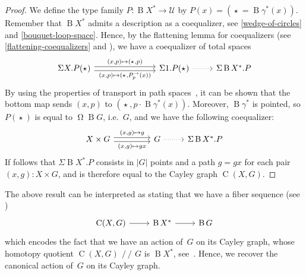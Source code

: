 \documentclass[10pt,a4paper]{amsart}
\theoremstyle{definition}
\newcommand{\freegroup}[1]{#1^*} %
\newcommand{\sizeof}[1]{|#1|} %
\newcommand{\B}{\operatorname{B}} %
\newcommand{\pt}[1]{\star_{#1}} %
\newcommand{\Cayley}[2]{\operatorname{C}(#1,#2)}
\newcommand{\pcomp}{\cdot} %
\newcommand{\subst}[2]{#1^\to_{#2}} %
\newcommand{\Loop}{\operatorname{\Omega}} %
\newcommand{\hq}{\mathop{\!/\!\!/\!}} %
\newcommand{\U}{\mathcal{U}} %
\newcommand{\ie}{i.e.~}
\begin{document}
\begin{proof}
  We define the type family $P:\B\freegroup X\to\U$ by
  $P(x)=(\pt{}=\B\freegroup \gamma(x))$. Remember that $\B\freegroup X$ admits a
  description as a coequalizer, see \cref{wedge-of-circles} and
  \cref{bouquet-loop-space}. Hence, by the flattening lemma for coequalizers
  (see \cref{flattening-coequalizers} and \cite[Section~6.12]{hottbook}), we
  have a coequalizer of total spaces
  \[
    \begin{tikzcd}
      \Sigma X.P(\pt{})
      \ar[r,shift left,"{(x,p)\mapsto(\pt{},p)}"]
      \ar[r,shift right,"{(x,p)\mapsto(\pt{},\subst Pp(x))}"']
      &[50]
      \Sigma 1.P(\pt{})
      \ar[r,dotted]
      &
      \Sigma \B\freegroup X.P
    \end{tikzcd}
  \]
  By using the properties of transport in path
  spaces~\cite[Theorem~2.11.3]{hottbook}, it can be shown that the bottom map
  sends $(x,p)$ to $(\pt{},p\pcomp\B\freegroup\gamma(x))$. Moreover,
  $\B\freegroup \gamma$ is pointed, so $P(\pt{})$ is equal to $\Loop\B G$,
  \ie $G$, and we have the following coequalizer:
  \[
    \begin{tikzcd}
      X\times G
      \ar[r,shift left,"{(x,g)\mapsto g}"]
      \ar[r,shift right,"{(x,g)\mapsto gx}"']
      &[20]
      G
      \ar[r,dotted]
      &
      \Sigma \B\freegroup X.P
    \end{tikzcd}
  \]
  If follows that $\Sigma\B\freegroup X.P$ consists in $\sizeof G$ points and a
  path $g=gx$ for each pair $(x,g):X\times G$, and is therefore equal to the
  Cayley graph $\Cayley XG$.
\end{proof}

\noindent
The above result can be interpreted as stating that we have a fiber sequence (see \cite[Section~8.4]{hottbook})
\[
  \begin{tikzcd}
    \Cayley XG\ar[r] & \B\freegroup X \ar[r]&\B G
  \end{tikzcd}
\]
which encodes the fact that we have an action of~$G$ on its Cayley graph, whose
homotopy quotient $\Cayley XG\hq G$ is $\B\freegroup X$,
see~\cite[Proposition~16]{lens}. Hence, we recover the canonical action of~$G$
on its Cayley graph.
\end{document}
